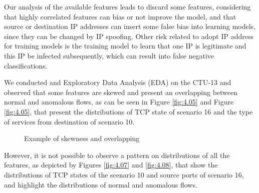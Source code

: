 Our analysis of the available features leads to discard some features, considering that highly correlated features can bias or not improve the model, and that source or destination IP addresses can insert some false bias into learning models, since they can be changed by IP spoofing. Other risk related to adopt IP address for training models is the training model to learn that
one IP is legitimate and this IP be infected subsequently, which can result into false negative classifications.

We conducted and Exploratory Data Analysis (EDA) on the CTU-13 and observed that some features are skewed and present an overlapping between normal and anomalous flows, as can be seen in Figure \ref{fig:4.05} and Figure \ref{fig:4.05}, that present the distributions of TCP state of scenario 16 and the type of services from destination of scenario 10.

\begin{figure}[!htb]
	\centering
	\caption[Skewness and Overlapping]{Example of skewness and overlapping}
	\label{fig:4.06}
\end{figure}

However, it is not possible to observe a pattern on distributions of all the features, as depicted by Figures \ref{fig:4.07} and \ref{fig:4.08}, that show the distributions of TCP states of the scenario 10 and source ports of scenario 16, and highlight the distributions of normal and anomalous flows.

